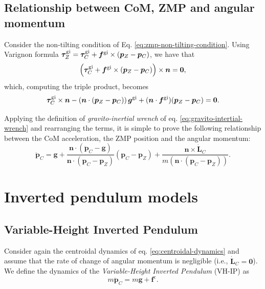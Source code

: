 \subsection{Relationship between CoM, ZMP and angular momentum}
Consider the non-tilting condition of Eq. \eqref{eq:zmp-non-tilting-condition}. Using Varignon formula $\bm{\tau}_Z^{\rm gi} = \bm{\tau}_C^{\rm gi} + \bm{f}^{\rm gi} \times (\bm{p}_Z - \bm{p}_C)$, we have that
\begin{equation}
    \left(\bm{\tau}_C^{\rm gi} + \bm{f}^{\rm gi} \times (\bm{p}_Z - \bm{p}_C)\right) \times \bm{n} = \bm{0},
\end{equation}
which, computing the triple product, becomes
\begin{equation}
    \bm{\tau}_C^{\rm gi} \times \bm{n} - \left(\bm{n} \cdot (\bm{p}_Z - \bm{p}_C)\right) \bm{g}^{\rm gi} + (\bm{n} \cdot \bm{f}^{\rm gi}) (\bm{p}_Z - \bm{p}_C) = \bm{0}.
\end{equation}

Applying the definition of \textit{gravito-inertial wrench} of eq. \eqref{eq:gravito-intertial-wrench} and rearranging the terms, it is simple to prove \cite{Caron2017TRO} the following relationship between the CoM acceleration, the ZMP position and the angular momentum:
\begin{equation}
    \label{eq:relationship-com-zmp-angular-momentum}
    \ddot{\bm{p}}_C = \bm{g} + \frac{\bm{n} \cdot (\bm{\ddot{p}}_C - \bm{g})}{\bm{n} \cdot (\bm{p}_C - \bm{p}_Z)} (\bm{p}_C - \bm{p}_Z) + \frac{\bm{n} \times \bm{\dot{L}}_C}{m \left(\bm{n} \cdot (\bm{p}_C - \bm{p}_Z)\right)}.
\end{equation}
\section{Inverted pendulum models}
\subsection{Variable-Height Inverted Pendulum}
Consider again the centroidal dynamics of eq. \eqref{eq:centroidal-dynamics}
and assume that the rate of change of angular momentum is negligible (i.e.,
$\dot{\bm{L}}_C=\bm{0}$). We define the dynamics of the \textit{Variable-Height
Inverted Pendulum} (VH-IP) \cite{Koolen2016VHIP} as
\begin{equation}
    \label{eq:VH-IP}
    m \ddot{\bm{p}}_C = m \bm{g} + \bm{f}^{\mathrm{c}}.
\end{equation}

